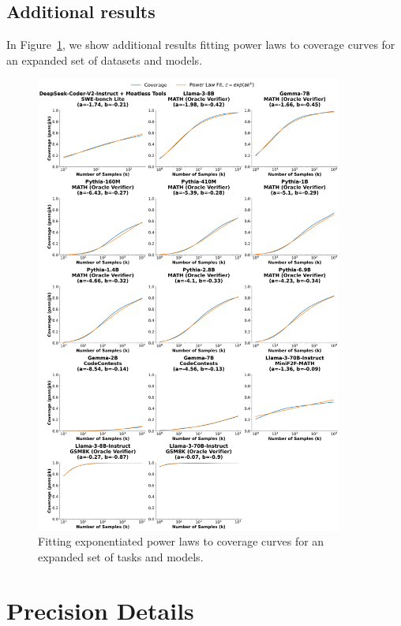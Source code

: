 \documentclass[11pt]{article}
\begin{document}
\subsection{Additional results}
\label{app:more_scaling_results}

In Figure~\ref{fig:expanded_predictions}, we show additional results fitting power laws to coverage curves for an expanded set of datasets and models. 

\begin{figure}
    \centering
    \includegraphics[width=0.9\textwidth]{figures/extra_predictions.pdf}
    \caption{Fitting exponentiated power laws to coverage curves for an expanded set of tasks and models. 
    }
    \label{fig:expanded_predictions}
\end{figure}

\newpage{}
\section{Precision Details}
\label{sec:precision_details}
\end{document}
